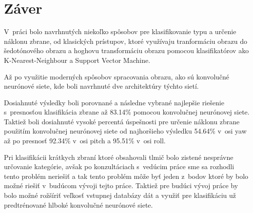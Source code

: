 
\chapter{Záver}

V~práci bolo navrhnutých niekoľko spôsobov pre klasifikovanie typu a určenie náklonu zbrane, od klasických prístupov,
    ktoré využívaju tranformáciu obrazu do šedotónového obrazu a hoghovu transformáciu obrazu pomocou
    klasifikatórov ako K-Nearest-Neighbour a Support Vector Machine.

Až po využitie moderných spôsobov spracovania obrazu, ako sú konvolučné neurónové siete, kde boli navrhnuté
    dve architektúry týchto sietí.

Dosiahnuté výsledky boli porovnané a následne vybrané najlepšie riešenie s~presnosťou klasifikácia zbrane až 83.14\%
    pomocou konvolučnej neurónovej siete.
Taktiež boli dosiahnuté vysoké percentá úspešnosti pre určenie náklonu zbrane použitím konvolučnej neurónovej siete od
    najhoršieho výsledku 54.64\% v~osi yaw až po presnosť 92.34\% v~osi pitch a 95.51\% v~osi roll.

Pri klasifikácii krátkych zbraní ktoré obsahovali tlmič bolo zistené nesprávne určovanie kategórie, avšak po
    konzultáciach s~vedúcim práce sme sa rozhodli tento problém neriešiť a tak tento problém môže byť jeden z~bodov ktoré by
    bolo možné riešiť v~budúcom vývoji tejto práce.
Taktiež pre budúci vývoj práce by bolo možné rožšíriť veľkosť vstupnej databázy dát a využiť pre klasifikáciu
    už predtrénované hlboké konvolučné neurónové siete.
